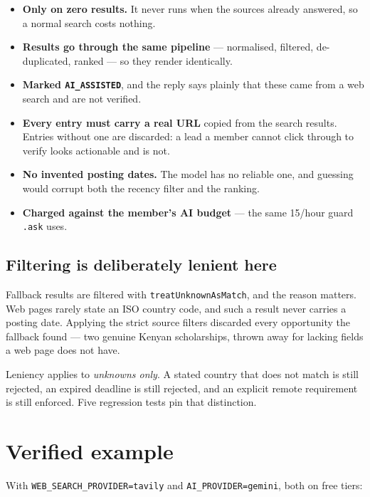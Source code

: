 \documentclass[11pt,a4paper]{report}
\newcommand{\dash}{---}
\begin{document}
\begin{itemize}
  \item \textbf{Only on zero results.} It never runs when the sources already
        answered, so a normal search costs nothing.
  \item \textbf{Results go through the same pipeline} \dash{} normalised,
        filtered, de-duplicated, ranked \dash{} so they render identically.
  \item \textbf{Marked \texttt{AI\_ASSISTED}}, and the reply says plainly that
        these came from a web search and are not verified.
  \item \textbf{Every entry must carry a real URL} copied from the search
        results. Entries without one are discarded: a lead a member cannot
        click through to verify looks actionable and is not.
  \item \textbf{No invented posting dates.} The model has no reliable one, and
        guessing would corrupt both the recency filter and the ranking.
  \item \textbf{Charged against the member's AI budget} \dash{} the same
        15/hour guard \texttt{.ask} uses.
\end{itemize}

\subsection*{Filtering is deliberately lenient here}

Fallback results are filtered with \texttt{treatUnknownAsMatch}, and the
reason matters. Web pages rarely state an ISO country code, and such a result
never carries a posting date. Applying the strict source filters discarded
every opportunity the fallback found \dash{} two genuine Kenyan scholarships,
thrown away for lacking fields a web page does not have.

Leniency applies to \emph{unknowns only}. A stated country that does not match
is still rejected, an expired deadline is still rejected, and an explicit
remote requirement is still enforced. Five regression tests pin that
distinction.

\section{Verified example}

With \texttt{WEB\_SEARCH\_PROVIDER=tavily} and \texttt{AI\_PROVIDER=gemini},
both on free tiers:
\end{document}
